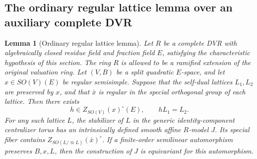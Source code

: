 \documentclass[11pt,a4paper]{article}
\newtheorem{lemma}[theorem]{Lemma}
\theoremstyle{definition}
\theoremstyle{remark}
\begin{document}
\subsection{The ordinary regular lattice lemma over an auxiliary complete DVR}
\label{subsec:so-ordinary}

\begin{lemma}[Ordinary regular lattice lemma]\label{lem:so-ordinary}
Let \(R\) be a complete DVR with algebraically closed residue field and
fraction field \(E\), satisfying the characteristic hypothesis of this
section. The ring \(R\) is allowed to be a ramified extension of the
original valuation ring. Let \((V,B)\) be a split quadratic
\(E\)-space, and let \(x\in SO(V)(E)\) be regular semisimple. Suppose
that the self-dual lattices \(L_1,L_2\) are preserved by \(x\), and that
\(\bar x\) is regular in the special orthogonal group of each lattice.
Then there exists
\[
 h\in Z_{SO(V)}(x)^\circ(E),\qquad hL_1=L_2.
\]
For any such lattice \(L\), the stabilizer of \(L\) in the generic
identity-component centralizer torus has an intrinsically defined
smooth affine \(R\)-model \(J\). Its special fiber contains
\(Z_{SO(L/\varpi L)}(\bar x)^\circ\). If a finite-order semilinear
automorphism preserves \(B,x,L\), then the construction of \(J\) is
equivariant for this automorphism.
\end{lemma}
\end{document}
